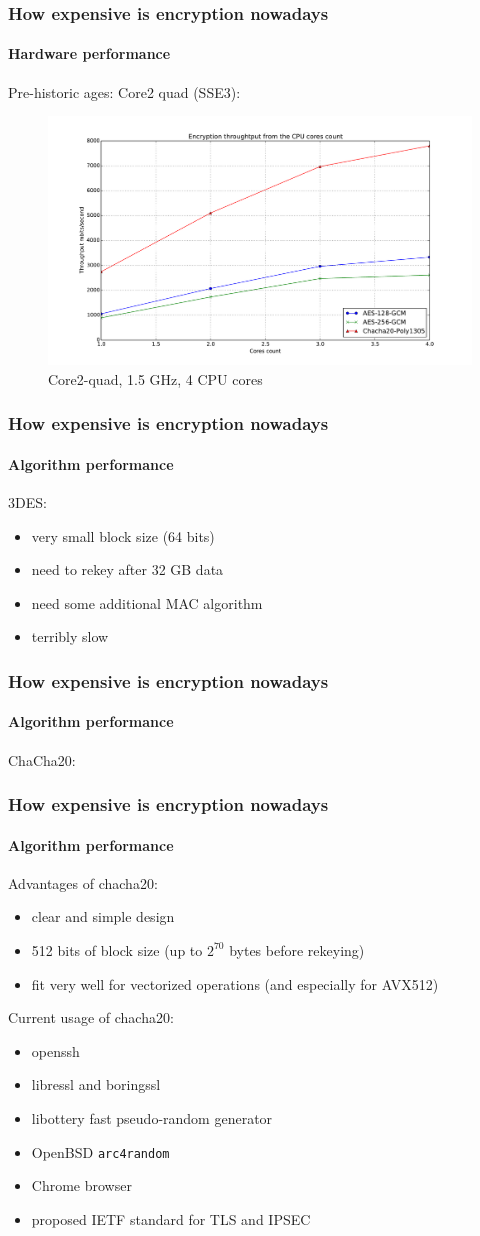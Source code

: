 \documentclass[12pt,t]{beamer}
\begin{document}
\begin{frame}
\frametitle{How expensive is encryption nowadays}
\framesubtitle{Hardware performance}
Pre-historic ages: Core2 quad (SSE3):
\begin{figure}[H]
\includegraphics[height=0.6\textheight]{perf-c2.pdf}
\caption{Core2-quad, 1.5 GHz, 4 CPU cores}
\end{figure}
\end{frame}

\begin{frame}
\frametitle{How expensive is encryption nowadays}
\framesubtitle{Algorithm performance} 
3DES:
	\begin{itemize}
	\item very small block size (64 bits)
	\item need to rekey after 32 GB data
	\item need some additional MAC algorithm
	\item terribly slow
	\end{itemize}
\end{frame}

\begin{frame}
\frametitle{How expensive is encryption nowadays}
\framesubtitle{Algorithm performance} 
ChaCha20:
\end{frame}

\begin{frame}
\frametitle{How expensive is encryption nowadays}
\framesubtitle{Algorithm performance} 
Advantages of chacha20:
\begin{itemize}
\item clear and simple design
\item 512 bits of block size (up to $2^{70}$ bytes before rekeying)
\item fit very well for vectorized operations (and especially for AVX512)
\end{itemize}
Current usage of chacha20:
\begin{itemize}
\item openssh
\item libressl and boringssl
\item libottery fast pseudo-random generator
\item OpenBSD \texttt{arc4random}
\item Chrome browser
\item proposed IETF standard for TLS and IPSEC
\end{itemize}
\end{frame}
\end{document}
